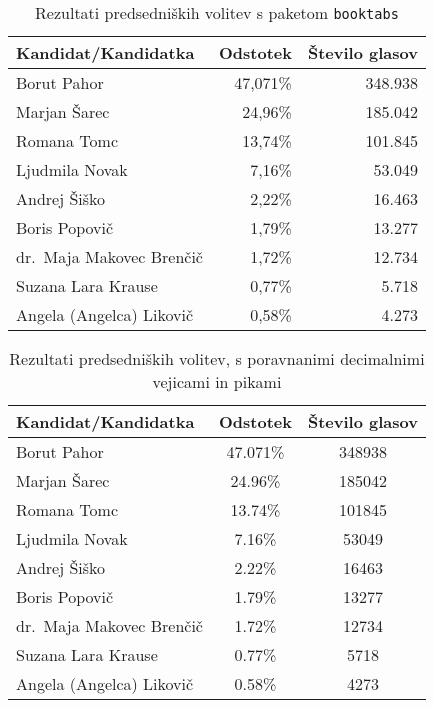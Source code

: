 \documentclass{article}
\begin{document}
\begin{table}[htb]
  \centering
  \begin{tabular}{lrr}
  \toprule
  \textbf{Kandidat/Kandidatka}        & \textbf{Odstotek} & \textbf{Število glasov} \\ \midrule
  Borut Pahor                & 47,071\%  & 348.938 \\
  Marjan Šarec               & 24,96\%  & 185.042 \\
  Romana Tomc                & 13,74\%  & 101.845 \\
  Ljudmila Novak             & 7,16\%   & 53.049 \\
  Andrej Šiško               & 2,22\%   & 16.463 \\
  Boris Popovič              & 1,79\%   & 13.277 \\
  dr.\ Maja Makovec Brenčič  & 1,72\%   & 12.734 \\
  Suzana Lara Krause         & 0,77\%   & 5.718 \\
  Angela (Angelca) Likovič   & 0,58\%   & 4.273 \\
  \bottomrule
  \end{tabular}
  \caption{Rezultati predsedniških volitev s paketom \texttt{booktabs}}
  \label{tab:volitve-booktabs}
\end{table}

\begin{table}[htb]
  \centering
  \begin{tabular}{lSS[group-minimum-digits=3]}
  \toprule
  \textbf{Kandidat/Kandidatka}        & \textbf{Odstotek} & \textbf{Število glasov} \\ \midrule
  Borut Pahor                & 47.071\%  & 348938 \\
  Marjan Šarec               & 24.96\%  & 185042 \\
  Romana Tomc                & 13.74\%  & 101845 \\
  Ljudmila Novak             & 7.16\%   & 53049 \\
  Andrej Šiško               & 2.22\%   & 16463 \\
  Boris Popovič              & 1.79\%   & 13277 \\
  dr.\ Maja Makovec Brenčič  & 1.72\%   & 12734 \\
  Suzana Lara Krause         & 0.77\%   & 5718 \\
  Angela (Angelca) Likovič   & 0.58\%   & 4273 \\
  \bottomrule
  \end{tabular}
  \caption{Rezultati predsedniških volitev, s poravnanimi decimalnimi vejicami in pikami}
  \label{tab:volitve-align}
\end{table}
\end{document}
